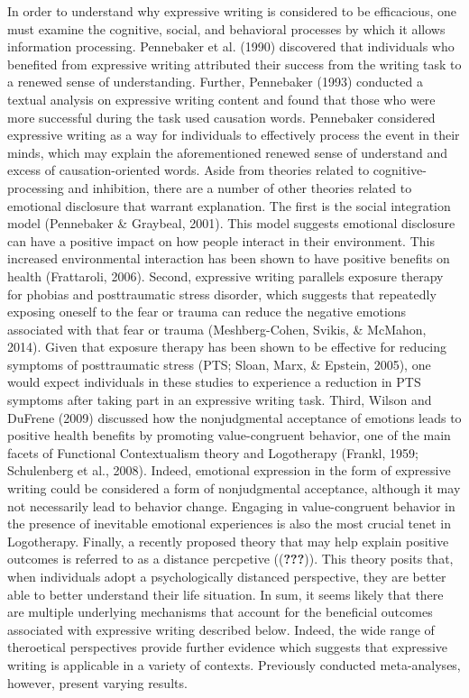 \documentclass[english,man, mask]{apa6}
\theoremstyle{definition}
\theoremstyle{definition}
\theoremstyle{definition}
\theoremstyle{remark}
\begin{document}
In order to understand why expressive writing is considered to be
efficacious, one must examine the cognitive, social, and behavioral
processes by which it allows information processing. Pennebaker et al.
(1990) discovered that individuals who benefited from expressive writing
attributed their success from the writing task to a renewed sense of
understanding. Further, Pennebaker (1993) conducted a textual analysis
on expressive writing content and found that those who were more
successful during the task used causation words. Pennebaker considered
expressive writing as a way for individuals to effectively process the
event in their minds, which may explain the aforementioned renewed sense
of understand and excess of causation-oriented words. Aside from
theories related to cognitive-processing and inhibition, there are a
number of other theories related to emotional disclosure that warrant
explanation. The first is the social integration model (Pennebaker \&
Graybeal, 2001). This model suggests emotional disclosure can have a
positive impact on how people interact in their environment. This
increased environmental interaction has been shown to have positive
benefits on health (Frattaroli, 2006). Second, expressive writing
parallels exposure therapy for phobias and posttraumatic stress
disorder, which suggests that repeatedly exposing oneself to the fear or
trauma can reduce the negative emotions associated with that fear or
trauma (Meshberg-Cohen, Svikis, \& McMahon, 2014). Given that exposure
therapy has been shown to be effective for reducing symptoms of
posttraumatic stress (PTS; Sloan, Marx, \& Epstein, 2005), one would
expect individuals in these studies to experience a reduction in PTS
symptoms after taking part in an expressive writing task. Third, Wilson
and DuFrene (2009) discussed how the nonjudgmental acceptance of
emotions leads to positive health benefits by promoting value-congruent
behavior, one of the main facets of Functional Contextualism theory and
Logotherapy (Frankl, 1959; Schulenberg et al., 2008). Indeed, emotional
expression in the form of expressive writing could be considered a form
of nonjudgmental acceptance, although it may not necessarily lead to
behavior change. Engaging in value-congruent behavior in the presence of
inevitable emotional experiences is also the most crucial tenet in
Logotherapy. Finally, a recently proposed theory that may help explain
positive outcomes is referred to as a distance percpetive
(({\textbf{???}})). This theory posits that, when individuals adopt a
psychologically distanced perspective, they are better able to better
understand their life situation. In sum, it seems likely that there are
multiple underlying mechanisms that account for the beneficial outcomes
associated with expressive writing described below. Indeed, the wide
range of theroetical perspectives provide further evidence which
suggests that expressive writing is applicable in a variety of contexts.
Previously conducted meta-analyses, however, present varying results.
\end{document}
